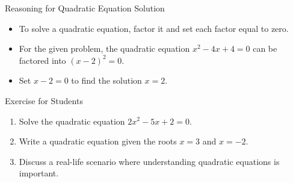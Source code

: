 \begin{frame}{Reasoning for Quadratic Equation Solution}
  \begin{itemize}
    \item To solve a quadratic equation, factor it and set each factor equal to zero.
    \item For the given problem, the quadratic equation $x^2 - 4x + 4 = 0$ can be factored into $(x - 2)^2 = 0$.
    \item Set $x - 2 = 0$ to find the solution $x = 2$.
  \end{itemize}
\end{frame}

\begin{frame}{Exercise for Students}
  \begin{enumerate}
    \item Solve the quadratic equation $2x^2 - 5x + 2 = 0$.
    \item Write a quadratic equation given the roots $x = 3$ and $x = -2$.
    \item Discuss a real-life scenario where understanding quadratic equations is important.
  \end{enumerate}
\end{frame}


